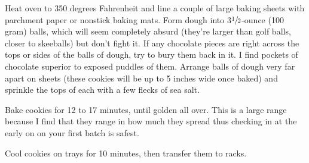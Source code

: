 Heat oven to 350 degrees Fahrenheit and line a couple of large baking sheets with parchment paper or nonstick baking mats. Form dough into 3$\sfrac{1}{2}$-ounce (100 gram) balls, which will seem completely absurd (they’re larger than golf balls, closer to skeeballs) but don’t fight it. If any chocolate pieces are right across the tops or sides of the balls of dough, try to bury them back in it. I find pockets of chocolate superior to exposed puddles of them. Arrange balls of dough very far apart on sheets (these cookies will be up to 5 inches wide once baked) and sprinkle the tops of each with a few flecks of sea salt.

Bake cookies for 12 to 17 minutes, until golden all over. This is a large range because I find that they range in how much they spread thus checking in at the early on on your first batch is safest.

Cool cookies on trays for 10 minutes, then transfer them to racks.

